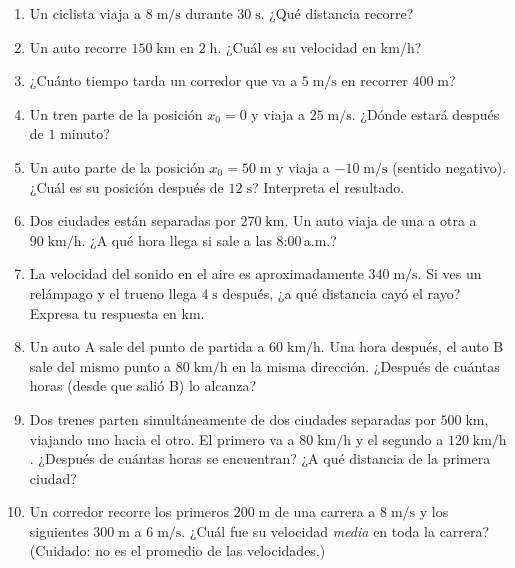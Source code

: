 \documentclass[12pt, letterpaper]{article}
\begin{document}
\begin{enumerate}[leftmargin=*, resume]
  \item \facil{} Un ciclista viaja a $8\;\text{m/s}$ durante $30\;\text{s}$. ¿Qué distancia recorre?

  \item \facil{} Un auto recorre $150\;\text{km}$ en $2\;\text{h}$. ¿Cuál es su velocidad en km/h?

  \item \facil{} ¿Cuánto tiempo tarda un corredor que va a $5\;\text{m/s}$ en recorrer $400\;\text{m}$?

  \item \facil{} Un tren parte de la posición $x_0 = 0$ y viaja a $25\;\text{m/s}$. ¿Dónde estará después de $1$ minuto?

  \item \medio{} Un auto parte de la posición $x_0 = 50\;\text{m}$ y viaja a $-10\;\text{m/s}$ (sentido negativo). ¿Cuál es su posición después de $12\;\text{s}$? Interpreta el resultado.

  \item \medio{} Dos ciudades están separadas por $270\;\text{km}$. Un auto viaja de una a otra a $90\;\text{km/h}$. ¿A qué hora llega si sale a las 8:00\,a.m.?

  \item \medio{} La velocidad del sonido en el aire es aproximadamente $340\;\text{m/s}$. Si ves un relámpago y el trueno llega $4\;\text{s}$ después, ¿a qué distancia cayó el rayo? Expresa tu respuesta en km.

  \item \medio{} Un auto A sale del punto de partida a $60\;\text{km/h}$. Una hora después, el auto B sale del mismo punto a $80\;\text{km/h}$ en la misma dirección. ¿Después de cuántas horas (desde que salió B) lo alcanza?

  \item \dificil{} Dos trenes parten simultáneamente de dos ciudades separadas por $500\;\text{km}$, viajando uno hacia el otro. El primero va a $80\;\text{km/h}$ y el segundo a $120\;\text{km/h}$. ¿Después de cuántas horas se encuentran? ¿A qué distancia de la primera ciudad?

  \item \dificil{} Un corredor recorre los primeros $200\;\text{m}$ de una carrera a $8\;\text{m/s}$ y los siguientes $300\;\text{m}$ a $6\;\text{m/s}$. ¿Cuál fue su velocidad \emph{media} en toda la carrera? (Cuidado: no es el promedio de las velocidades.)


\end{enumerate}
\end{document}
